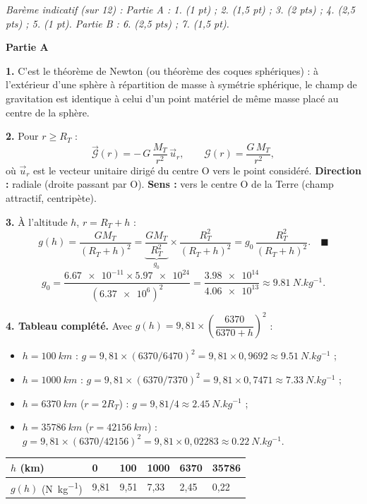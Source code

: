 \documentclass[11pt]{article}
\newcommand{\cle}[1]{{\popxbold\color{popdark}#1}}
\begin{document}
\begin{corrige}
\emph{Barème indicatif (sur 12) : Partie A : 1. (1 pt) ; 2. (1,5 pt) ; 3. (2 pts) ; 4. (2,5 pts) ; 5. (1 pt). Partie B : 6. (2,5 pts) ; 7. (1,5 pt).}

\textbf{Partie A}

\textbf{1.} C'est le \cle{théorème de Newton} (ou théorème des coques sphériques) : à l'extérieur d'une sphère à répartition de masse à symétrie sphérique, le champ de gravitation est identique à celui d'un point matériel de même masse placé au centre de la sphère.

\textbf{2.} Pour $r \geq R_T$ :
\[
\vec{\mathcal{G}}(r) = -\,G\,\frac{M_T}{r^2}\,\vec{u}_r, \qquad \mathcal{G}(r) = \frac{G\,M_T}{r^2},
\]
où $\vec{u}_r$ est le vecteur unitaire dirigé du centre O vers le point considéré. \textbf{Direction :} radiale (droite passant par O). \textbf{Sens :} vers le centre O de la Terre (champ attractif, centripète).

\textbf{3.} À l'altitude $h$, $r = R_T + h$ :
\[
g(h) = \frac{G M_T}{(R_T+h)^2} = \underbrace{\frac{G M_T}{R_T^2}}_{g_0}\times\frac{R_T^2}{(R_T+h)^2} = g_0\,\frac{R_T^2}{(R_T+h)^2}. \quad \blacksquare
\]
\[
g_0 = \frac{\num{6,67e-11}\times\num{5,97e24}}{(\num{6,37e6})^2} = \frac{\num{3,98e14}}{\num{4,06e13}} \approx \SI{9,81}{N.kg^{-1}}.
\]

\textbf{4. Tableau complété.} Avec $g(h) = 9,81\times\left(\dfrac{6370}{6370+h}\right)^2$ :
\begin{itemize}
\item $h = \SI{100}{km}$ : $g = 9,81\times(6370/6470)^2 = 9,81\times 0,9692 \approx \SI{9,51}{N.kg^{-1}}$ ;
\item $h = \SI{1000}{km}$ : $g = 9,81\times(6370/7370)^2 = 9,81\times 0,7471 \approx \SI{7,33}{N.kg^{-1}}$ ;
\item $h = \SI{6370}{km}$ ($r = 2R_T$) : $g = 9,81/4 \approx \SI{2,45}{N.kg^{-1}}$ ;
\item $h = \SI{35786}{km}$ ($r = \SI{42156}{km}$) : $g = 9,81\times(6370/42156)^2 = 9,81\times 0,02283 \approx \SI{0,22}{N.kg^{-1}}$.
\end{itemize}

\begin{center}
\begin{tabularx}{\linewidth}{|l|*{5}{X|}}
\hline
\rowcolor{popblueL}
$h$ (km) & 0 & 100 & 1000 & 6370 & 35786 \\
\hline
$g(h)$ (\si{N.kg^{-1}}) & 9,81 & 9,51 & 7,33 & 2,45 & 0,22 \\
\hline
\end{tabularx}
\end{center}


\end{corrige}
\end{document}
